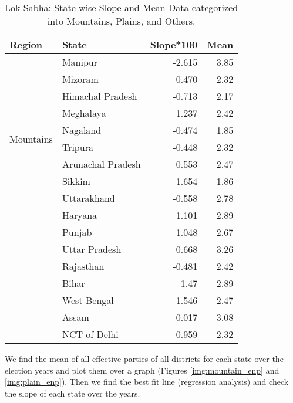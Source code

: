 \begin{table}[h!]
\centering
\begin{tabular}{|l|l|r|r|}
\hline
\textbf{Region} & \textbf{State} & \textbf{Slope*100} & \textbf{Mean} \\ \hline
\multirow{10}{*}{Mountains} & Manipur & -2.615 & 3.85 \\ \cline{2-4}
& Mizoram & 0.470 & 2.32 \\ \cline{2-4}
& Himachal Pradesh & -0.713 & 2.17 \\ \cline{2-4}
& Meghalaya & 1.237 & 2.42 \\ \cline{2-4}
& Nagaland & -0.474 & 1.85 \\ \cline{2-4}
& Tripura & -0.448 & 2.32 \\ \cline{2-4}
& Arunachal Pradesh & 0.553 & 2.47 \\ \cline{2-4}
& Sikkim & 1.654 & 1.86 \\ \cline{2-4}
& Uttarakhand & -0.558 & 2.78 \\ \hline
\multirow{8}{*}{Plains} & Haryana & 1.101 & 2.89 \\ \cline{2-4}
& Punjab & 1.048 & 2.67 \\ \cline{2-4}
& Uttar Pradesh & 0.668 & 3.26 \\ \cline{2-4}
& Rajasthan & -0.481 & 2.42 \\ \cline{2-4}
& Bihar & 1.47 & 2.89 \\ \cline{2-4}
& West Bengal & 1.546 & 2.47 \\ \cline{2-4}
& Assam & 0.017 & 3.08 \\ \cline{2-4}
& NCT of Delhi & 0.959 & 2.32 \\ \hline
\end{tabular}
\caption{Lok Sabha: State-wise Slope and Mean Data categorized into Mountains, Plains, and Others.}
\label{tab:state_data}
\end{table}
\vspace{0.3cm} 
We find the mean of all effective parties of all districts for each state over the election years and plot them over a graph (Figures \ref{img:mountain_enp} and \ref{img:plain_enp}). Then we find the best fit line (regression analysis) and check the slope of each state over the years.

\vspace{0.3cm}

